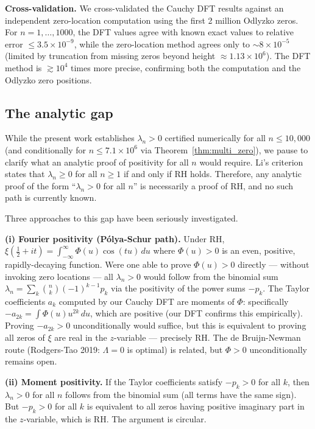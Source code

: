 \documentclass[11pt]{article}
\begin{document}
\textbf{Cross-validation.}
We cross-validated the Cauchy DFT results against an independent zero-location computation
using the first 2 million Odlyzko zeros. For $n = 1,\ldots,1000$, the DFT values agree
with known exact values to relative error $\le 3.5\times10^{-9}$, while the zero-location
method agrees only to $\sim 8\times10^{-5}$ (limited by truncation from missing zeros
beyond height $\approx 1.13\times10^6$). The DFT method is $\gtrsim 10^4$ times more
precise, confirming both the computation and the Odlyzko zero positions.

\subsection{The analytic gap}

While the present work establishes $\lambda_n > 0$ certified numerically for all
$n \le 10{,}000$ (and conditionally for $n \le 7.1\times10^6$ via Theorem~\ref{thm:multi_zero}),
we pause to clarify what an analytic proof of positivity for all $n$
would require. Li's criterion states that $\lambda_n \ge 0$ for all $n \ge 1$ if and
only if RH holds. Therefore, any analytic proof of the form ``$\lambda_n > 0$ for all
$n$'' is necessarily a proof of RH, and no such path is currently known.

Three approaches to this gap have been seriously investigated.

\textbf{(i) Fourier positivity (Pólya-Schur path).}
Under RH, $\xi(\tfrac{1}{2}+it) = \int_{-\infty}^\infty \Phi(u)\cos(tu)\,du$
where $\Phi(u) > 0$ is an even, positive, rapidly-decaying function.
Were one able to prove $\Phi(u) > 0$ directly --- without invoking zero locations ---
all $\lambda_n > 0$ would follow from the binomial sum $\lambda_n = \sum_k \binom{n}{k}(-1)^{k-1}p_k$
via the positivity of the power sums $-p_k$.
The Taylor coefficients $a_k$ computed by our Cauchy DFT are moments of $\Phi$:
specifically $-a_{2k} = \int \Phi(u) u^{2k}\,du$, which are positive (our DFT confirms this empirically).
Proving $-a_{2k} > 0$ unconditionally would suffice, but this is equivalent to proving
all zeros of $\xi$ are real in the $z$-variable --- precisely RH.
The de Bruijn-Newman route (Rodgers-Tao 2019: $\Lambda = 0$ is optimal) is related,
but $\Phi > 0$ unconditionally remains open.

\textbf{(ii) Moment positivity.}
If the Taylor coefficients satisfy $-p_k > 0$ for all $k$, then $\lambda_n > 0$
for all $n$ follows from the binomial sum (all terms have the same sign).
But $-p_k > 0$ for all $k$ is equivalent to all zeros having positive imaginary part
in the $z$-variable, which is RH. The argument is circular.
\end{document}
